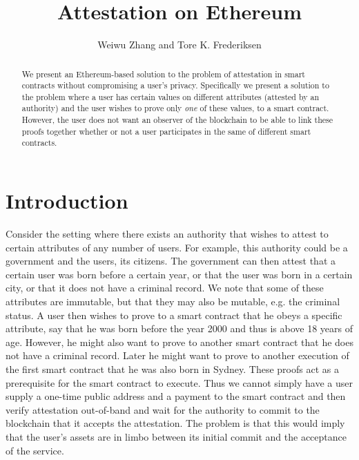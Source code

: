 \documentclass[11pt]{article} %
\author{Weiwu Zhang and Tore K. Frederiksen} \title{Attestation on Ethereum}
\begin{document}
\maketitle
\begin{abstract}
We present an Ethereum-based solution to the problem of attestation in smart contracts without compromising a user's privacy. Specifically we present a solution to the problem where a user has certain values on different attributes (attested by an authority) and the user wishes to prove only \emph{one} of these values, to a smart contract. However, the user does not want an observer of the blockchain to be able to link these proofs together whether or not a user participates in the same of different smart contracts.
\end{abstract}


\section{Introduction}
Consider the setting where there exists an authority that wishes to attest to certain attributes of any number of users. For example, this authority could be a government and the users, its citizens. The government can then attest that a certain user was born before a certain year, or that the user was born in a certain city, or that it does not have a criminal record. We note that some of these attributes are immutable, but that they may also be mutable, e.g. the criminal status. A user then wishes to prove to a smart contract that he obeys a specific attribute, say that he was born before the year 2000 and thus is above 18 years of age. However, he might also want to prove to another smart contract that he does not have a criminal record. Later he might want to prove to another execution of the first smart contract that he was also born in Sydney. These proofs act as a prerequisite for the smart contract to execute.
Thus we cannot simply have a user supply a one-time public address and a payment to the smart contract and then verify attestation out-of-band and wait for the authority to commit to the blockchain that it accepts the attestation. The problem is that this would imply that the user's assets are in limbo between its initial commit and the acceptance of the service. 
\end{document}
